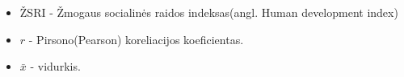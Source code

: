 \begin{itemize}
    \item ŽSRI - Žmogaus socialinės raidos indeksas(angl. Human development index)
    \item $r$ - Pirsono(Pearson) koreliacijos koeficientas.
    \item $\bar{x}$ - vidurkis.
\end{itemize}